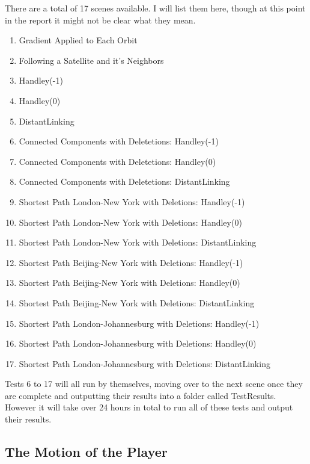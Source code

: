 \documentclass[12pt]{report}
\begin{document}
There are a total of 17 scenes available. I will list them here, though at this point in the report it might not be clear what they mean.

\begin{enumerate}
\item Gradient Applied to Each Orbit
\item Following a Satellite and it's Neighbors
\item Handley(-1)
\item Handley(0)
\item DistantLinking
\item Connected Components with Deletetions: Handley(-1)
\item Connected Components with Deletetions: Handley(0)
\item Connected Components with Deletetions: DistantLinking
\item Shortest Path London-New York with Deletions: Handley(-1)
\item Shortest Path London-New York with Deletions: Handley(0)
\item Shortest Path London-New York with Deletions: DistantLinking
\item Shortest Path Beijing-New York with Deletions: Handley(-1)
\item Shortest Path Beijing-New York with Deletions: Handley(0)
\item Shortest Path Beijing-New York with Deletions: DistantLinking
\item Shortest Path London-Johannesburg with Deletions: Handley(-1)
\item Shortest Path London-Johannesburg with Deletions: Handley(0)
\item Shortest Path London-Johannesburg with Deletions: DistantLinking
\end{enumerate}

Tests 6 to 17 will all run by themselves, moving over to the next scene once they are complete and outputting their results into a folder called TestResults. However it will take over 24 hours in total to run all of these tests and output their results.

\subsection{The Motion of the Player}
\end{document}
